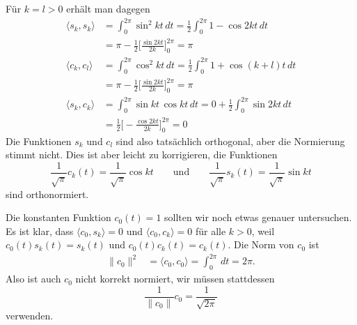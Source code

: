 Für $k=l>0$ erhält man dagegen
\begin{align*}
\langle s_k, s_k\rangle
&=
\int_0^{2\pi} \sin^2 kt \,dt
=
\frac12\int_0^{2\pi} 1 - \cos2kt\,dt
\\
&=
\pi
-
\frac12\biggl[ \frac{\sin2kt}{2k} \biggr]_0^{2\pi}
=
\pi
\\
\langle c_k, c_l\rangle
&=
\int_0^{2\pi} \cos^2 kt \,dt
=
\frac12\int_0^{2\pi} 1 + \cos(k+l)t\,dt
\\
&=
\pi
-
\frac12\biggl[ \frac{\sin 2kt}{2k}\biggr]_0^{2\pi}
=
\pi
\\
\langle s_k, c_k\rangle
&=
\int_0^{2\pi} \sin kt\, \cos kt \,dt
=
0
+
\frac12\int_0^{2\pi} \sin 2k t\,dt
\\
&=
\frac12\biggl[-\frac{\cos2kt}{2k}\biggr]_0^{2\pi}
=
0
\end{align*}
Die Funktionen $s_k$ und $c_l$ sind also tatsächlich orthogonal, aber
die Normierung stimmt nicht.
Dies ist aber leicht zu korrigieren, die Funktionen
\[
\frac1{\sqrt{\pi}} c_k(t) = \frac{1}{\sqrt{\pi}} \cos kt
\qquad\text{und}\qquad
\frac1{\sqrt{\pi}} s_k(t) = \frac{1}{\sqrt{\pi}} \sin kt
\]
sind orthonormiert.

Die konstanten Funktion $c_0(t)=1$ sollten wir noch etwas genauer untersuchen.
Es ist klar, dass $\langle c_0,s_k\rangle = 0$ und $\langle c_0,c_k\rangle=0$
für alle $k>0$, weil $c_0(t)s_k(t)=s_k(t)$ und $c_0(t)c_k(t)=c_k(t)$.
Die Norm von $c_0$ ist
\begin{align*}
\|c_0\|^2&=\langle c_0,c_0\rangle = \int_0^{2\pi}\,dt = 2\pi.
\end{align*}
Also ist auch $c_0$ nicht korrekt normiert, wir müssen stattdessen
\[
\frac1{\|c_0\|}c_0 = \frac{1}{\sqrt{2\pi}}
\]
verwenden.

